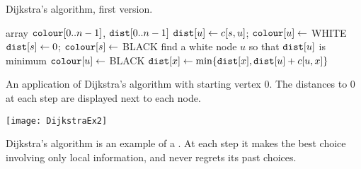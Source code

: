\begin{algorithm}[H]
  \caption{Dijkstra's algorithm, first version.}
    \label{alg:dijkstra}
\begin{algorithmic}[1]
	\State array $\operatorname{\text{\texttt{colour}}}[0..n-1]$, $\operatorname{\text{\texttt{dist}}}[0..n-1]$
		\State $\operatorname{\text{\texttt{dist}}}[u] \gets c[s,u]$; $\operatorname{\text{\texttt{colour}}}[u] \gets$ WHITE 
	\EndFor
	\State $\operatorname{\text{\texttt{dist}}}[s] \gets 0$; $\operatorname{\text{\texttt{colour}}}[s] \gets $ BLACK
		\State find a white node $u$ so that $\operatorname{\text{\texttt{dist}}}[u]$ is minimum
		\State $\operatorname{\text{\texttt{colour}}}[u] \gets $ BLACK
				\State $\operatorname{\text{\texttt{dist}}}[x] \gets \min \{\operatorname{\text{\texttt{dist}}}[x], \operatorname{\text{\texttt{dist}}}[u] + c[u,x]\}$  
			\EndIf
		\EndFor
	\EndWhile
	\State \Return{$\dist$}
\EndFunction
\end{algorithmic}
\end{algorithm}

\begin{Boxample}
An application of Dijkstra's algorithm with starting vertex $0$. 
The distances to 0 at each step are displayed next to each node.
\begin{center}
\texttt{[image: DijkstraEx2]}
\end{center}
\end{Boxample}

Dijkstra's algorithm is an example of a . 
At each step it makes the best choice involving only local information,
and never regrets its past choices. 

